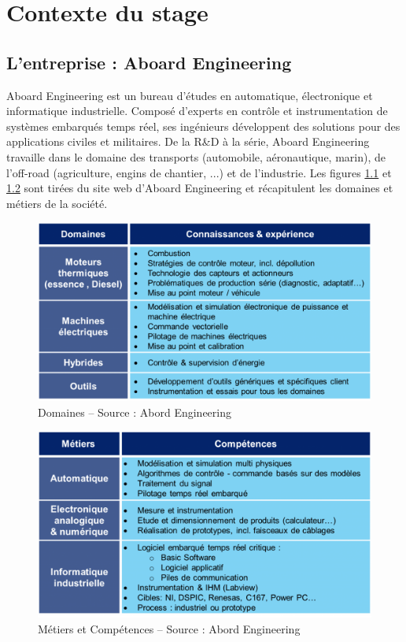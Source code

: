 \chapter{Contexte du stage}
\section{L'entreprise : Aboard Engineering}
Aboard Engineering est un bureau d'études en automatique, électronique et
informatique industrielle. Composé d'experts en contrôle et instrumentation de
systèmes embarqués temps réel, ses ingénieurs développent des solutions pour des
applications civiles et militaires. De la R\&D à la série, Aboard Engineering
travaille dans le domaine des transports (automobile, aéronautique, marin), de
l'off-road (agriculture, engins de chantier, ...) et de l'industrie. Les figures
\ref{fig:domaines} et  \ref{fig:metiers} sont tirées du site web d'Aboard
Engineering et récapitulent les domaines et métiers de la société.

\begin{figure}[h]
	\center
	\includegraphics[scale=0.4]{images/domaines}
	\caption{Domaines -- Source : Abord Engineering}
	\label{fig:domaines}
\end{figure}

\begin{figure}[h]
	\center
	\includegraphics[scale=0.4]{images/metiers}
	\caption{Métiers et Compétences -- Source : Abord Engineering}
	\label{fig:metiers}
\end{figure}

